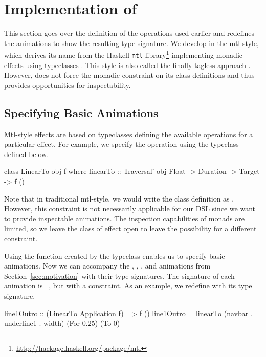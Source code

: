 \section{Implementation of \dsl{}}
\label{sec:detail}

This section goes over the definition of the operations used earlier and redefines the animations to show the resulting type signature. We develop \dsl{} in the mtl-style, which derives its name from the Haskell \texttt{mtl} library\footnote{\url{http://hackage.haskell.org/package/mtl}} implementing monadic effects using typeclasses \cite{DBLP:conf/afp/Jones95}. This style is also called the finally tagless approach \cite{DBLP:journals/jfp/CaretteKS09}. However, \dsl{} does not force the monadic constraint on its class definitions and thus provides opportunities for inspectability.

\subsection{Specifying Basic Animations}

Mtl-style effects are based on typeclasses defining the available operations for a particular effect. For example, we specify the  operation using the  typeclass defined below.

\begin{code}
class LinearTo obj f where
  linearTo :: Traversal' obj Float -> Duration -> Target -> f ()
\end{code}

Note that in traditional mtl-style, we would write the class definition as . However, this constraint is not necessarily applicable for our DSL since we want to provide inspectable animations. The inspection capabilities of monads are limited, so we leave the class of effect open to leave the possibility for a different constraint.

Using the  function created by the  typeclass enables us to specify basic animations. Now we can accompany the , , , and  animations from Section~\ref{sec:motivation} with their type signatures. The signature of each animation is ~\hs{()}, but with a  constraint. As an example, we redefine  with its type signature. 

\begin{code}
line1Outro :: (LinearTo Application f) => f ()
line1Outro = linearTo (navbar . underline1 . width) (For 0.25) (To 0)
\end{code}

